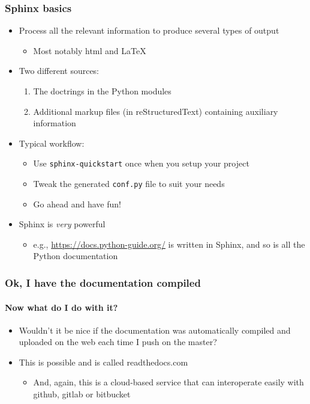 \documentclass[9pt]{beamer}
\begin{document}
\begin{frame}
  \frametitle{Sphinx basics}
  \begin{itemize}
  \item Process all the relevant information to produce several types of
    output
    \begin{itemize}
    \item Most notably html and LaTeX
    \end{itemize}
  \item Two different sources:
    \begin{enumerate}
    \item The doctrings in the Python modules
    \item Additional markup files (in reStructuredText) containing
      auxiliary information
    \end{enumerate}
  \item Typical workflow:
    \begin{itemize}
    \item Use \texttt{sphinx-quickstart} once when you setup your project
    \item Tweak the generated \texttt{conf.py} file to suit your needs
    \item Go ahead and have fun!
    \end{itemize}
  \item Sphinx is \emph{very} powerful
    \begin{itemize}
    \item e.g., \url{https://docs.python-guide.org/} is written in Sphinx,
      and so is all the Python documentation
    \end{itemize}
  \end{itemize}
\end{frame}


\begin{frame}
  \frametitle{Ok, I have the documentation compiled}
  \framesubtitle{Now what do I do with it?}
  \begin{itemize}
  \item Wouldn't it be nice if the documentation was automatically compiled and
    uploaded on the web each time I push on the master?
  \item This is possible and is called readthedocs.com
    \begin{itemize}
    \item And, again, this is a cloud-based service that can interoperate
      easily with github, gitlab or bitbucket
    \end{itemize}
  \end{itemize}
\end{frame}
\end{document}
